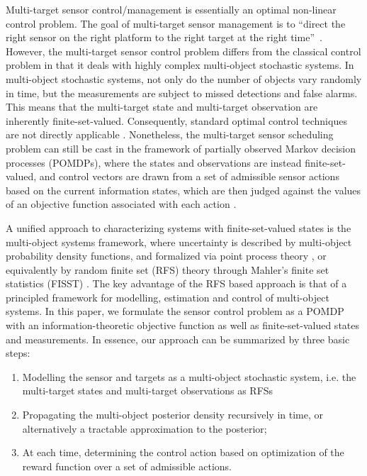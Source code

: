 \documentclass[twocolumn]{autart}
\begin{document}
Multi-target sensor control/management is essentially an optimal non-linear
control problem. The goal of multi-target sensor management is to
\textquotedblleft direct the right sensor on the right platform to the right
target at the right time\textquotedblright\ \cite{Mah03a}. However, the
multi-target sensor control problem differs from the classical control
problem in that it deals with highly complex multi-object stochastic
systems. In multi-object stochastic systems, not only do the number of
objects vary randomly in time, but the measurements are subject to missed
detections and false alarms. This means that the multi-target state and
multi-target observation are inherently finite-set-valued. Consequently,
standard optimal control techniques are not directly applicable \cite{Mah04}. Nonetheless, the multi-target sensor scheduling problem can still be cast
in the framework of partially observed Markov decision processes (POMDPs),
where the states and observations are instead finite-set-valued, and control
vectors are drawn from a set of admissible sensor actions based on the
current information states, which are then judged against the values of
an objective function associated with each action \cite{CC08}.

A unified approach to characterizing systems with finite-set-valued states
is the multi-object systems framework, where uncertainty is described by
multi-object probability density functions, and formalized via point process
theory \cite{DJ88,SKM95}, or equivalently by random finite set (RFS) theory
through Mahler's finite set statistics (FISST) \cite{Mah07}. The key
advantage of the RFS based approach is that of a principled framework for
modelling, estimation and control of multi-object systems. In this paper, we
formulate the sensor control problem as a POMDP with an
information-theoretic objective function as well as finite-set-valued states
and measurements. In essence, our approach can be summarized by three basic
steps:

\begin{enumerate}
\item Modelling the sensor and targets as a multi-object stochastic system,
i.e. the multi-target states and multi-target observations as RFSs

\item Propagating the multi-object posterior density recursively in time, or
alternatively a tractable approximation to the posterior;

\item At each time, determining the control action based on optimization of
the reward function over a set of admissible actions.
\end{enumerate}
\end{document}
